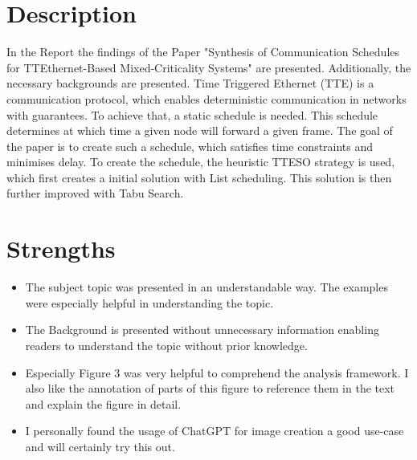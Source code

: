 \documentclass[12pt,british,a4paper]{article}
\begin{document}
\maketitle
\section{Description}
In the Report the findings of the Paper "Synthesis of Communication Schedules for
TTEthernet-Based Mixed-Criticality Systems" are presented.
Additionally, the necessary backgrounds are presented.
Time Triggered Ethernet (TTE) is a communication protocol, which enables deterministic communication in networks with guarantees.
To achieve that, a static schedule is needed.
This schedule determines at which time a given node will forward a given frame.
The goal of the paper is to create such a schedule, which satisfies time constraints and minimises delay. To create the schedule, the heuristic TTESO strategy is used, which first creates a initial solution with List scheduling. This solution is then further improved with Tabu Search.
\section{Strengths}
\begin{itemize}
    \item The subject topic was presented in an understandable way.
    The examples were especially helpful in understanding the topic.
    \item The Background is presented without unnecessary information enabling readers to understand the topic without prior knowledge.
    \item Especially Figure 3 was very helpful to comprehend the analysis framework.
    I also like the annotation of parts of this figure to reference them in the text and explain the figure in detail.
    \item I personally found the usage of ChatGPT for image creation a good use-case and will certainly try this out.
\end{itemize}
\end{document}
